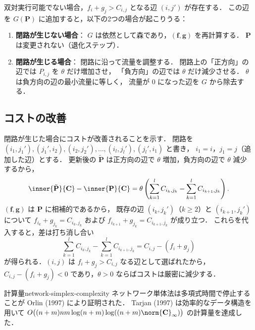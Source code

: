 双対実行可能でない場合，$f_i + g_j > C_{i,j}$ となる辺 $(i, j')$ が存在する．
この辺を $G(\mathbf{P})$ に追加すると，以下の2つの場合が起こりうる：

\begin{enumerate}
  \item \textbf{閉路が生じない場合}：
    $G$ は依然として森であり，$(\mathbf{f}, \mathbf{g})$ を再計算する．
    $\mathbf{P}$ は変更されない（退化ステップ）．
  \item \textbf{閉路が生じる場合}：
    閉路に沿って流量を調整する．
    閉路上の「正方向」の辺では $P_{i,j}$ を $\theta$ だけ増加させ，
    「負方向」の辺では $\theta$ だけ減少させる．
    $\theta$ は負方向の辺の最小流量に等しく，
    流量が $0$ になった辺を $G$ から除去する．
\end{enumerate}

\subsection{コストの改善}

閉路が生じた場合にコストが改善されることを示す．
閉路を $(i_1, j_1'), (j_1', i_2), (i_2, j_2'), \ldots, (i_l, j_l'), (j_l', i_1)$ と書き，
$i_1 = i$，$j_1 = j$（追加した辺）とする．
更新後の $\tilde{\mathbf{P}}$ は正方向の辺で $\theta$ 増加，負方向の辺で $\theta$ 減少するから，
\[
  \inner{\tilde{\mathbf{P}}}{\mathbf{C}} - \inner{\mathbf{P}}{\mathbf{C}}
  = \theta \left( \sum_{k=1}^l C_{i_k, j_k} - \sum_{k=1}^l C_{i_{k+1}, j_k} \right).
\]
$(\mathbf{f}, \mathbf{g})$ は $\mathbf{P}$ に相補的であるから，
既存の辺 $(i_k, j_k')$（$k \geq 2$）と $(i_{k+1}, j_k')$ について
$f_{i_k} + g_{j_k} = C_{i_k, j_k}$ および $f_{i_{k+1}} + g_{j_k} = C_{i_{k+1}, j_k}$ が成り立つ．
これらを代入すると，差は打ち消し合い
\[
  \sum_{k=1}^l C_{i_k, j_k} - \sum_{k=1}^l C_{i_{k+1}, j_k} = C_{i,j} - (f_i + g_j)
\]
が得られる．$(i, j)$ は $f_i + g_j > C_{i,j}$ なる辺として選ばれたから，
$C_{i,j} - (f_i + g_j) < 0$ であり，$\theta > 0$ ならばコストは厳密に減少する．

\begin{remark}{計算量}{network-simplex-complexity}
  ネットワーク単体法は多項式時間で停止することが Orlin (1997) により証明された．
  Tarjan (1997) は効率的なデータ構造を用いて
  $O\bigl((n+m)nm \log(n+m) \log((n+m)\norm{\mathbf{C}}_\infty)\bigr)$
  の計算量を達成した．
\end{remark}

